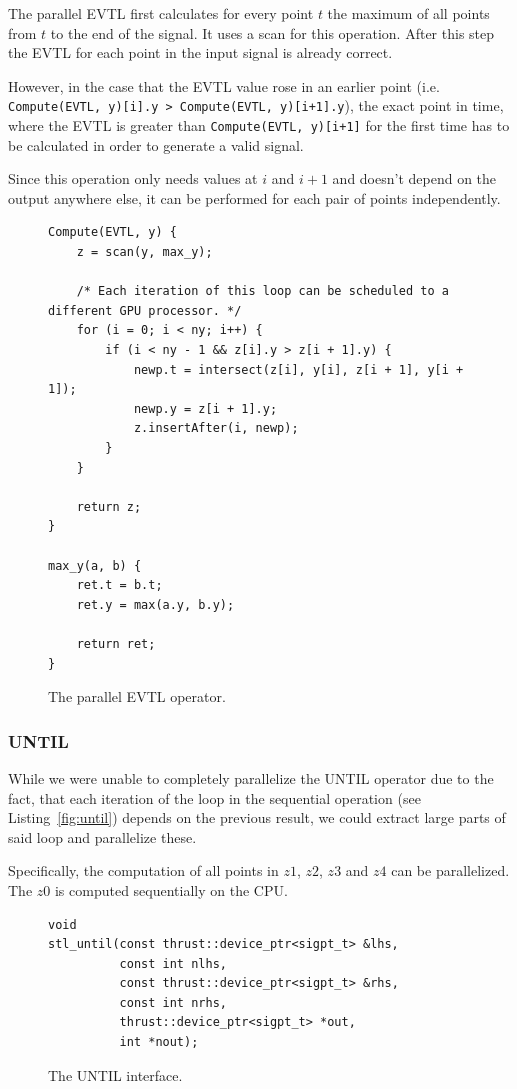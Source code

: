 \documentclass[a4paper,10pt]{article}
\begin{document}
The parallel EVTL first calculates for every point $t$ the maximum of all points from
$t$ to the end of the signal. It uses a scan for this operation. After this step the
EVTL for each point in the input signal is already correct.

However, in the case that the EVTL value rose in an earlier point (i.e.
\lstinline|Compute(EVTL, y)[i].y > Compute(EVTL, y)[i+1].y|), the exact point in time,
where the EVTL is greater than \lstinline|Compute(EVTL, y)[i+1]| for the first time
has to be calculated in order to generate a valid signal.

Since this operation only needs values at $i$ and $i + 1$ and doesn't depend on the
output anywhere else, it can be performed for each pair of points independently.

\begin{figure}[H]
\begin{lstlisting}
Compute(EVTL, y) {
    z = scan(y, max_y);

    /* Each iteration of this loop can be scheduled to a different GPU processor. */
    for (i = 0; i < ny; i++) {
        if (i < ny - 1 && z[i].y > z[i + 1].y) {
            newp.t = intersect(z[i], y[i], z[i + 1], y[i + 1]);
            newp.y = z[i + 1].y;
            z.insertAfter(i, newp);
        }
    }

    return z;
}

max_y(a, b) {
    ret.t = b.t;
    ret.y = max(a.y, b.y);

    return ret;
}
\end{lstlisting}
\label{fig:par_evtl}
\caption{The parallel EVTL operator.}
\end{figure}

\subsubsection{UNTIL}

While we were unable to completely parallelize the UNTIL operator due to the fact,
that each iteration of the loop in the sequential operation (see
Listing~\ref{fig:until}) depends on the previous result, we could extract large parts
of said loop and parallelize these.

Specifically, the computation of all points in $z1$, $z2$, $z3$ and $z4$ can be
parallelized. The $z0$ is computed sequentially on the CPU.

\begin{figure}[H]
\begin{lstlisting}
void
stl_until(const thrust::device_ptr<sigpt_t> &lhs,
          const int nlhs,
          const thrust::device_ptr<sigpt_t> &rhs,
          const int nrhs,
          thrust::device_ptr<sigpt_t> *out,
          int *nout);
\end{lstlisting}
\caption{
\label{fig:parallel_until}
The UNTIL interface.}
\end{figure}
\end{document}
